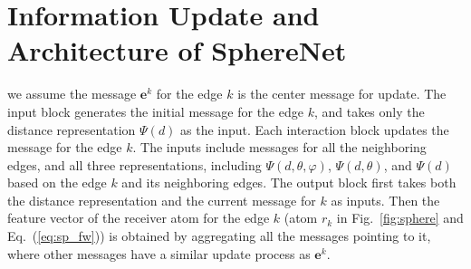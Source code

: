 \documentclass{article}
\begin{document}
\section{Information Update and Architecture of SphereNet} \label{sec:arch} \label{sec:supp_B}
we assume the message 
$\mathbf{e}^k$ for the edge $k$ is the center message for update.
The input block generates the initial message for the edge $k$, 
and
takes only the distance representation $\Psi(d)$ as the input. 
Each interaction block updates the message for the edge $k$.
The inputs include messages for all the neighboring edges,
and all three representations, including
$\Psi(d, \theta, \varphi)$,
$\Psi(d, \theta)$,
and $\Psi(d)$
based on the edge $k$ and its neighboring edges.
The output block first takes both the distance representation and the
current message for $k$ as inputs.
Then the feature vector of the receiver atom for the edge $k$ (atom $r_k$ in Fig.~\ref{fig:sphere} and Eq.~(\ref{eq:sp_fw})) is obtained by 
aggregating all the messages pointing to it,
where other messages have a similar update process as $\mathbf{e}^k$.
\end{document}
